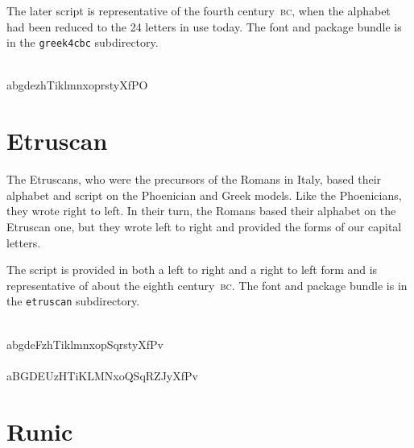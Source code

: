\documentclass{article}
\newcommand{\BC}{\textsc{bc}}
\begin{document}
   The later script is representative of the fourth century~\BC, when the
alphabet had been reduced to the 24 letters in use today.
    The font and package bundle is in the \texttt{greek4cbc} subdirectory.

\begin{center}
\givbcfamily
\Aalpha \Abeta \Agamma \Adelta \Aepsilon \Azeta \Aeta
\Atheta \Aiota \Akappa \Alambda \Amu \Anu \Axi \Aomicron \Api
\Arho \Asigma \Atau \Aupsilon \Achi \Aphi \Apsi \Aomega \\
abgdezhTiklmnxoprstyXfPO \\
\end{center}

\section{Etruscan}

    The Etruscans, who were the precursors of the Romans in Italy, based their
alphabet and script on the Phoenician and Greek models. Like the Phoenicians,
they wrote right to left. In their turn, the Romans based their alphabet on
the Etruscan one, but they wrote left to right and provided the forms of
our capital letters.

    The script is provided in both a left to right and a right to left form
and is representative of about the eighth century~\BC.
    The font and package bundle is in the \texttt{etruscan} subdirectory.

\begin{center}
\etrfamily
\Aalpha \Abeta \Agamma \Adelta \Aepsilon \Adigamma \Azeta \Aeta
\Atheta \Aiota \Akappa \Alambda \Amu \Anu \Axi \Aomicron \Api
\Aesade \Aqoph \Arho \Asigma \Atau \Aupsilon \Achi \Aphi \Apsi \Avau \\
abgdeFzhTiklmnxopSqrstyXfPv \\
\ARalpha \ARbeta \ARgamma \ARdelta \ARepsilon \ARdigamma \ARzeta \AReta
\ARtheta \ARiota \ARkappa \ARlambda \ARmu \ARnu \ARxi \ARomicron \ARpi
\AResade \ARqoph \ARrho \ARsigma \ARtau \ARupsilon \ARchi \ARphi \ARpsi \ARvau \\
aBGDEUzHTiKLMNxoQSqRZJyXfPv \\
\end{center}
    

\section{Runic}
\end{document}
